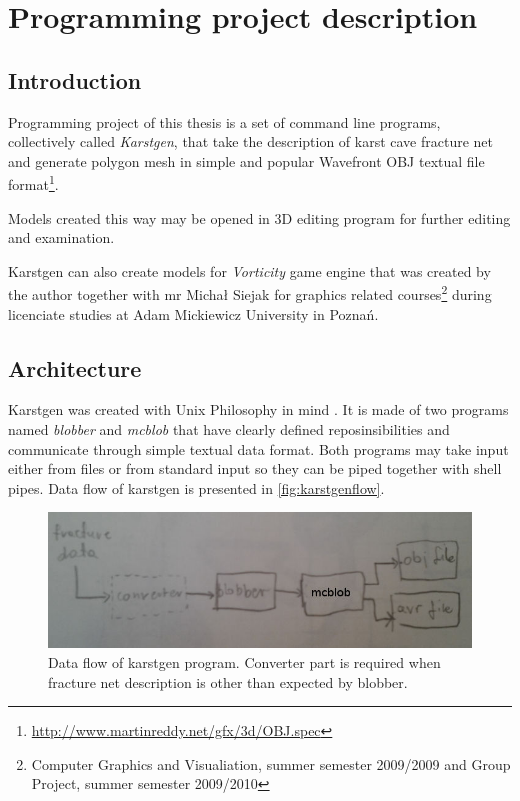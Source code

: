 \chapter{Programming project description}
\label{chap:project}
\section{Introduction}

Programming project of this thesis is a set of command line programs, collectively
called \emph{Karstgen}, that take
the description of karst cave fracture net and generate polygon mesh in
simple and popular Wavefront OBJ textual file format\footnote{\url{http://www.martinreddy.net/gfx/3d/OBJ.spec}}.

Models created this way may be opened in 3D editing program for further editing
and examination.

Karstgen can also create models for \emph{Vorticity} game engine that was created
by the author together with mr Michał Siejak for graphics related courses\footnote{Computer
  Graphics and Visualiation, summer semester 2009/2009 and Group Project, summer
semester 2009/2010} during licenciate studies at Adam Mickiewicz University in
Poznań.

\section{Architecture}

Karstgen was created with Unix Philosophy in mind \parencite{raymond2003art}.
It is made of two programs named \emph{blobber} and \emph{mcblob} that have
clearly defined reposinsibilities and communicate through simple textual data
format.  Both programs may take input either from files or from standard input
so they can be piped together with shell pipes. Data flow of karstgen is
presented in \autoref{fig:karstgenflow}.
\begin{figure}[ht]
  \begin{center}
    \includegraphics[width=\textwidth]{chapters/project/karstgenflow.jpg}
  \end{center}
  \caption{Data flow of karstgen program. Converter part is required when fracture
  net description is other than expected by blobber.}
  \label{fig:karstgenflow}
\end{figure}


